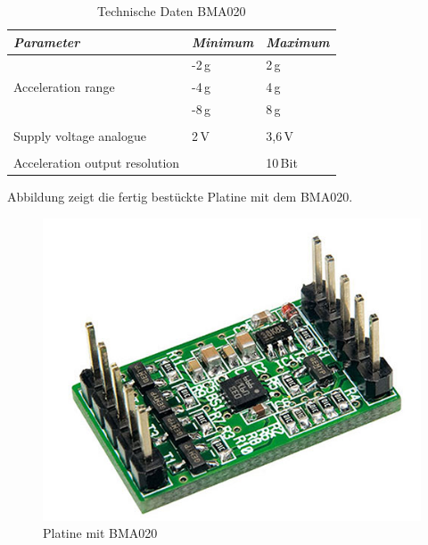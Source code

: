 \begin{table}[H]
\centering
\begin{tabular}{
lll
}
\toprule

\multicolumn{1}{p{5.5cm}}{\textit{Parameter}} & \multicolumn{1}{p{3cm}}{\textit{Minimum} }&\multicolumn{1}{p{3cm}}{\textit{Maximum}}\\\midrule
&-2\,g & 2\,g\\
Acceleration range & -4\,g & 4\,g\\
&-8\,g & 8\,g\\
&&\\
Supply voltage analogue & 2\,V & 3,6\,V\\
&&\\
Acceleration output resolution &&10\,Bit\\
\bottomrule
\end{tabular}
\caption{Technische Daten BMA020 \citep{Datenblatt_BMA020}}
\label{Tabelle_Technische_Daten_BMA020}
\end{table}

Abbildung zeigt die fertig bestückte Platine mit dem BMA020.

\begin{figure}[!h] 
  \centering
     \includegraphics[scale=.4]{BilderAllgemein/Beschleunigungssensor.png}
  \caption{Platine mit BMA020 \citep{Bild_BMA020}}
  \label{Abb_HYT221}
\end{figure}
\newpage


